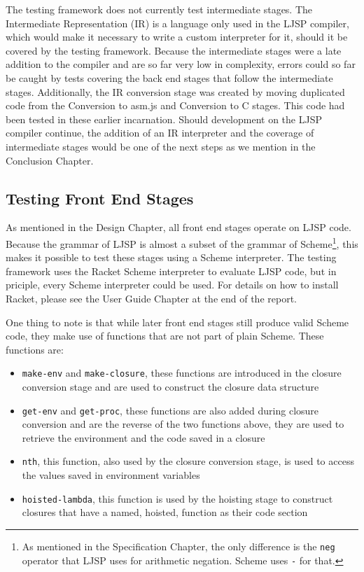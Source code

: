 \documentclass[11pt]{report}
\begin{document}
The testing framework does not currently test intermediate stages. The Intermediate Representation (IR) is a language only used in the LJSP compiler, which would make it necessary to write a custom interpreter for it, should it be covered by the testing framework. Because the intermediate stages were a late addition to the compiler and are so far very low in complexity, errors could so far be caught by tests covering the back end stages that follow the intermediate stages. Additionally, the IR conversion stage was created by moving duplicated code from the Conversion to asm.js and Conversion to C stages. This code had been tested in these earlier incarnation. Should development on the LJSP compiler continue, the addition of an IR interpreter and the coverage of intermediate stages would be one of the next steps as we mention in the Conclusion Chapter.

\subsection{Testing Front End Stages}
As mentioned in the Design Chapter, all front end stages operate on LJSP code. Because the grammar of LJSP is almost a subset of the grammar of Scheme\footnote{As mentioned in the Specification Chapter, the only difference is the \texttt{neg} operator that LJSP uses for arithmetic negation. Scheme uses \texttt{-} for that.}, this makes it possible to test these stages using a Scheme interpreter. The testing framework uses the Racket Scheme interpreter to evaluate LJSP code, but in priciple, every Scheme interpreter could be used. For details on how to install Racket, please see the User Guide Chapter at the end of the report.

One thing to note is that while later front end stages still produce valid Scheme code, they make use of functions that are not part of plain Scheme. These functions are:

\begin{itemize}
\item \texttt{make-env} and \texttt{make-closure}, these functions are introduced in the closure conversion stage and are used to construct the closure data structure
\item \texttt{get-env} and \texttt{get-proc}, these functions are also added during closure conversion and are the reverse of the two functions above, they are used to retrieve the environment and the code saved in a closure
\item \texttt{nth}, this function, also used by the closure conversion stage, is used to access the values saved in environment variables
\item \texttt{hoisted-lambda}, this function is used by the hoisting stage to construct closures that have a named, hoisted, function as their code section
\end{itemize}
\end{document}

